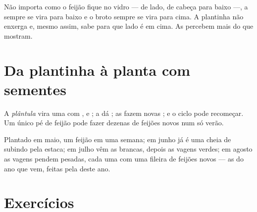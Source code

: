 \begin{remark}\label{rem:g2:from-seed-to-plant:updown}
Não importa como o feijão fique no vidro --- de lado, de cabeça para
baixo ---, a  sempre se vira para baixo e o broto sempre se vira
para cima. A plantinha não enxerga e, mesmo assim, sabe para que
lado é em cima. As  percebem mais do que mostram.
\end{remark}

\section{Da plantinha à planta com sementes}

\begin{proposition}\label{prop:g2:from-seed-to-plant:cycle}
A \emph{plântula} vira uma  com , 
e ; a  dá ; as  fazem novas
\emph{}; e o ciclo pode recomeçar. Um único pé de feijão
pode fazer dezenas de feijões novos num só verão.
\end{proposition}
\admitted

\begin{example}\label{ex:g2:from-seed-to-plant:summer}
Plantado em maio, um feijão  em uma semana; em junho já é uma
 cheia de  subindo pela estaca; em julho vêm as 
brancas, depois as vagens verdes; em agosto as vagens pendem
pesadas, cada uma com uma fileira de feijões novos --- as  do
ano que vem, feitas pela  deste ano.
\end{example}

\section{Exercícios}

